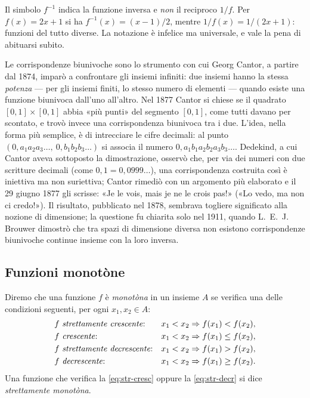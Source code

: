\begin{attenzione}[$f^{-1}$ non è $1/f$]
Il simbolo $f^{-1}$ indica la funzione inversa e \emph{non} il reciproco $1/f$. Per
$f(x)=2x+1$ si ha $f^{-1}(x)=(x-1)/2$, mentre $1/f(x)=1/(2x+1)$: funzioni del tutto
diverse. La notazione è infelice ma universale, e vale la pena di abituarsi subito.
\end{attenzione}

\begin{notastorica}
Le corrispondenze biunivoche sono lo strumento con cui Georg Cantor, a partire dal
1874, imparò a confrontare gli insiemi infiniti: due insiemi hanno la stessa
\emph{potenza} --- per gli insiemi finiti, lo stesso numero di elementi --- quando
esiste una funzione biunivoca dall'uno all'altro. Nel 1877 Cantor si chiese se il
quadrato $[0,1]\times[0,1]$ abbia «più punti» del segmento $[0,1]$, come tutti davano
per scontato, e trovò invece una corrispondenza biunivoca tra i due. L'idea, nella forma
più semplice, è di intrecciare le cifre decimali: al punto
$(0{,}a_{1}a_{2}a_{3}\dots,\ 0{,}b_{1}b_{2}b_{3}\dots)$ si associa il numero
$0{,}a_{1}b_{1}a_{2}b_{2}a_{3}b_{3}\dots$. Dedekind, a cui Cantor aveva sottoposto la
dimostrazione, osservò che, per via dei numeri con due scritture decimali (come
$0{,}1=0{,}0999\dots$), una corrispondenza costruita così è iniettiva ma non suriettiva;
Cantor rimediò con un argomento più elaborato e il 29 giugno 1877 gli scrisse: «Je le
vois, mais je ne le crois pas!» («Lo vedo, ma non ci credo!»). Il risultato, pubblicato
nel 1878, sembrava togliere significato alla nozione di dimensione; la questione fu
chiarita solo nel 1911, quando L.~E.~J. Brouwer dimostrò che tra spazi di dimensione
diversa non esistono corrispondenze biunivoche continue insieme con la loro inversa.
\end{notastorica}

\subsection{Funzioni monotòne}

\begin{definizione}
Diremo che una funzione $f$ è \emph{monotòna} in un insieme $A$ se verifica una delle
condizioni seguenti, per ogni $x_{1},x_{2}\in A$:
\begin{align}
  &f \text{ \emph{strettamente crescente}:}   & x_{1}<x_{2} &\Rightarrow f(x_{1})<f(x_{2}),\label{eq:str-cresc}\\
  &f \text{ \emph{crescente}:}                & x_{1}<x_{2} &\Rightarrow f(x_{1})\le f(x_{2}),\label{eq:cresc}\\
  &f \text{ \emph{strettamente decrescente}:} & x_{1}<x_{2} &\Rightarrow f(x_{1})>f(x_{2}),\label{eq:str-decr}\\
  &f \text{ \emph{decrescente}:}              & x_{1}<x_{2} &\Rightarrow f(x_{1})\ge f(x_{2}).\label{eq:decr}
\end{align}
Una funzione che verifica la \eqref{eq:str-cresc} oppure la \eqref{eq:str-decr} si
dice \emph{strettamente monotòna}.
\end{definizione}

